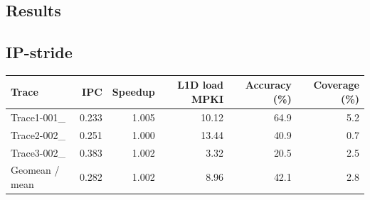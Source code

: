\subsection{Results}
\subsection*{IP-stride}
\begin{center}
\small
\begin{tabular}{lrrrrr}
\toprule
Trace & IPC & Speedup & L1D load MPKI & Accuracy (\%) & Coverage (\%) \\
\midrule
Trace1-001\_ & 0.233 & 1.005 & 10.12 & 64.9 & 5.2 \\
Trace2-002\_ & 0.251 & 1.000 & 13.44 & 40.9 & 0.7 \\
Trace3-002\_ & 0.383 & 1.002 & 3.32 & 20.5 & 2.5 \\
Geomean / mean & 0.282 & 1.002 & 8.96 & 42.1 & 2.8 \\
\bottomrule
\end{tabular}
\end{center}
